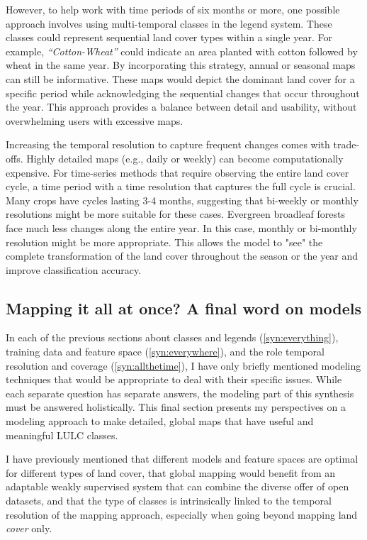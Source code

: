         However, to help work with time periods of six months or more, one possible approach involves using multi-temporal classes in the legend system. These classes could represent sequential land cover types within a single year. For example, \emph{``Cotton-Wheat''} could indicate an area planted with cotton followed by wheat in the same year. By incorporating this strategy, annual or seasonal maps can still be informative. These maps would depict the dominant land cover for a specific period while acknowledging the sequential changes that occur throughout the year. This approach provides a balance between detail and usability, without overwhelming users with excessive maps.
                
        Increasing the temporal resolution to capture frequent changes comes with trade-offs. Highly detailed maps (e.g., daily or weekly) can become computationally expensive. For time-series methods that require observing the entire land cover cycle, a time period with a time resolution that captures the full cycle is crucial. Many crops have cycles lasting 3-4 months, suggesting that bi-weekly or monthly resolutions might be more suitable for these cases. Evergreen broadleaf forests face much less changes along the entire year. In this case, monthly or bi-monthly resolution might be more appropriate. This allows the model to "see" the complete transformation of the land cover throughout the season or the year and improve classification accuracy. 

    \subsection{Mapping it all at once? A final word on models}

        In each of the previous sections about classes and legends (\ref{syn:everything}), training data and feature space (\ref{syn:everywhere}), and the role temporal resolution and coverage (\ref{syn:allthetime}), I have only briefly mentioned modeling techniques that would be appropriate to deal with their specific issues. While each separate question has separate answers, the modeling part of this synthesis must be answered holistically. This final section presents my perspectives on a modeling approach to make detailed, global maps that have useful and meaningful LULC classes. 
        
        I have previously mentioned that different models and feature spaces are optimal for different types of land cover, that global mapping would benefit from an adaptable weakly supervised system that can combine the diverse offer of open datasets, and that the type of classes is intrinsically linked to the temporal resolution of the mapping approach, especially when going beyond mapping land \textit{cover} only.


